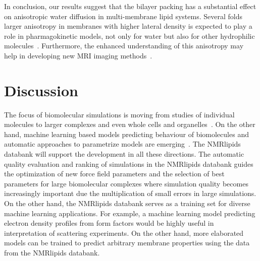 \documentclass[fleqn,10pt]{wlscirep}
\begin{document}
In conclusion, our results suggest that the bilayer packing has a substantial effect on anisotropic water diffusion in multi-membrane lipid systems. Several folds larger anisotropy in membranes with higher lateral density is expected to play a role in pharmagokinetic models, not only for water but also for other hydrophilic molecules~\cite{nitsche19}. Furthermore, the enhanced understanding of this anisotropy may help in developing new MRI imaging methods~\cite{topgaard20}.

\section{Discussion}


The focus of biomolecular simulations is moving from studies of individual molecules to larger complexes and even whole cells and organelles~\cite{johnson15,thornburg22,gupta22}. On the other hand, machine learning based models predicting behaviour of biomolecules and automatic approaches to parametrize models are emerging~\cite{jumper21,antila22b}. The NMRlipids databank will support the development in all these directions. The automatic quality evaluation and ranking of simulations in the NMRlipids databank guides the optimization of new force field parameters and the selection of best parameters for large biomolecular complexes where simulation quality becomes increasingly important due the multiplication of small errors in large simulations. On the other hand, the NMRlipids databank serves as a training set for diverse machine learning applications. 
For example, a machine learning model predicting electron density profiles from form factors would be highly useful in interpretation of scattering experiments. On the other hand, more elaborated models can be trained to predict arbitrary membrane properties using the data from the NMRlipids databank. 
\end{document}
